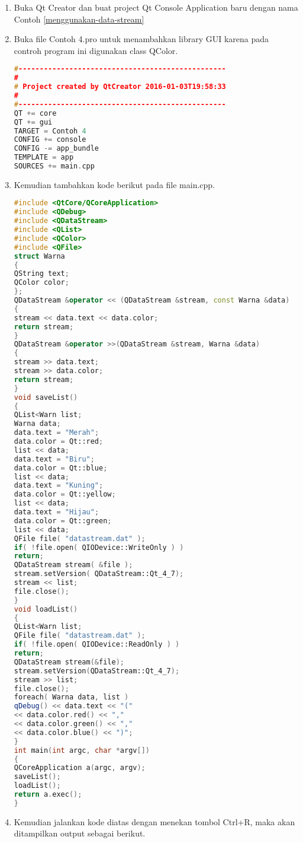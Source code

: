 \begin{enumerate}

\item
  Buka Qt Creator dan buat project Qt Console Application baru dengan
  nama Contoh \ref{menggunakan-data-stream}
\item
  Buka file Contoh 4.pro untuk menambahkan library GUI karena pada
  controh program ini digunakan class QColor.

\begin{lstlisting}[language=c++, caption=file pro untuk membuka library Qt GUI, label=menggunakan-data-stream]
#-------------------------------------------------
#
# Project created by QtCreator 2016-01-03T19:58:33
#
#-------------------------------------------------
QT += core
QT += gui
TARGET = Contoh 4
CONFIG += console
CONFIG -= app_bundle
TEMPLATE = app
SOURCES += main.cpp
\end{lstlisting}
\item
  Kemudian tambahkan kode berikut pada file main.cpp.

\begin{lstlisting}[language=c++, caption=Menggunakan Data Stream, label=main-kode-data-stream]
#include <QtCore/QCoreApplication>
#include <QDebug>
#include <QDataStream>
#include <QList>
#include <QColor>
#include <QFile>
struct Warna
{
QString text;
QColor color;
};
QDataStream &operator << (QDataStream &stream, const Warna &data)
{
stream << data.text << data.color;
return stream;
}
QDataStream &operator >>(QDataStream &stream, Warna &data)
{
stream >> data.text;
stream >> data.color;
return stream;
}
void saveList()
{
QList<Warn list;
Warna data;
data.text = "Merah";
data.color = Qt::red;
list << data;
data.text = "Biru";
data.color = Qt::blue;
list << data;
data.text = "Kuning";
data.color = Qt::yellow;
list << data;
data.text = "Hijau";
data.color = Qt::green;
list << data;
QFile file( "datastream.dat" );
if( !file.open( QIODevice::WriteOnly ) )
return;
QDataStream stream( &file );
stream.setVersion( QDataStream::Qt_4_7);
stream << list;
file.close();
}
void loadList()
{
QList<Warn list;
QFile file( "datastream.dat" );
if( !file.open( QIODevice::ReadOnly ) )
return;
QDataStream stream(&file);
stream.setVersion(QDataStream::Qt_4_7);
stream >> list;
file.close();
foreach( Warna data, list )
qDebug() << data.text << "("
<< data.color.red() << ","
<< data.color.green() << ","
<< data.color.blue() << ")";
}
int main(int argc, char *argv[])
{
QCoreApplication a(argc, argv);
saveList();
loadList();
return a.exec();
}
\end{lstlisting}
\item
  Kemudian jalankan kode diatas dengan menekan tombol Ctrl+R, maka akan
  ditampilkan output sebagai berikut.
\end{enumerate}

